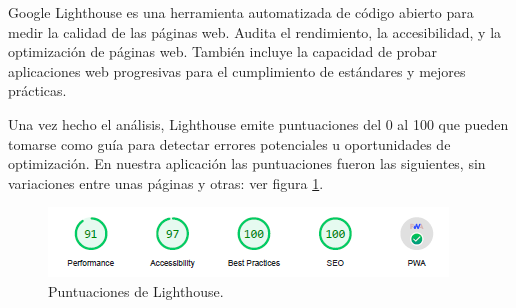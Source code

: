 \documentclass[12pt,twoside,titlepage]{report}
\begin{document}
Google Lighthouse es una herramienta automatizada de código abierto para medir la calidad de las páginas web. Audita el rendimiento, la accesibilidad, y la optimización de páginas web.
También incluye la capacidad de probar aplicaciones web progresivas para el cumplimiento de estándares y mejores prácticas.


Una vez hecho el análisis, Lighthouse emite puntuaciones del 0 al 100 que pueden tomarse como guía para detectar errores potenciales u oportunidades de optimización. En nuestra aplicación las puntuaciones fueron las siguientes, sin variaciones entre unas páginas y otras: ver figura \ref{fig:Lighthouse_resumen}.

\begin{figure}[H]
    \centering
    \includegraphics[width=\textwidth]{Lighthouse/Resumen}
    \caption{Puntuaciones de Lighthouse.}
    \label{fig:Lighthouse_resumen}
\end{figure}
\end{document}
